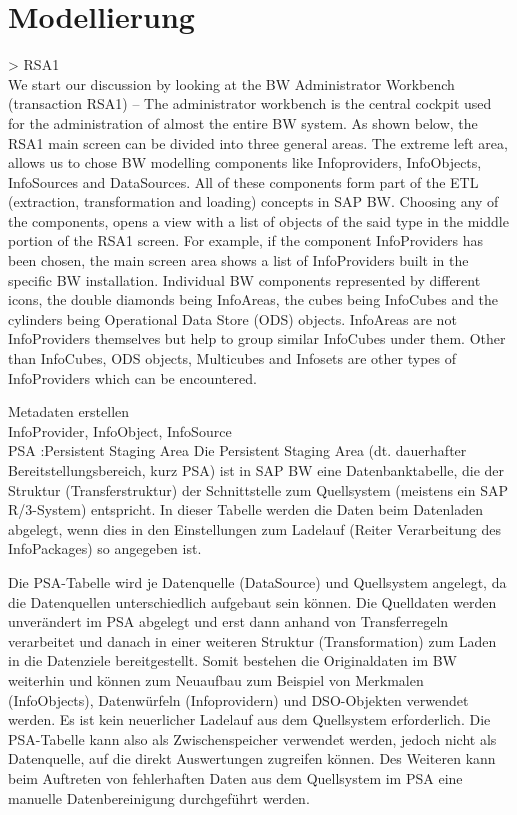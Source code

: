 \chapter{Modellierung}
> RSA1\\



We start our discussion by looking at the BW Administrator Workbench (transaction RSA1) – The administrator workbench is the central cockpit used for the administration of almost the entire BW system. As shown below, the RSA1 main screen can be divided into three general areas. The extreme left area, allows us to chose BW modelling components like Infoproviders, InfoObjects, InfoSources and DataSources. All of these components form part of the ETL (extraction, transformation and loading) concepts in SAP BW. Choosing any of the components, opens a view with a list of objects of the said type in the middle portion of the RSA1 screen. For example, if the component InfoProviders has been chosen, the main screen area shows a list of InfoProviders built in the specific BW installation. Individual BW components represented by different icons, the double diamonds being InfoAreas, the cubes being InfoCubes and the cylinders being Operational Data Store (ODS) objects. InfoAreas are not InfoProviders themselves but help to group similar InfoCubes under them. Other than InfoCubes, ODS objects, Multicubes and Infosets are other types of InfoProviders which can be encountered.



Metadaten erstellen\\
InfoProvider, InfoObject, InfoSource\\
PSA :Persistent Staging Area
Die Persistent Staging Area (dt. dauerhafter Bereitstellungsbereich, kurz PSA) ist in SAP BW eine Datenbanktabelle, die der Struktur (Transferstruktur) der Schnittstelle zum Quellsystem (meistens ein SAP R/3-System) entspricht. In dieser Tabelle werden die Daten beim Datenladen abgelegt, wenn dies in den Einstellungen zum Ladelauf (Reiter Verarbeitung des InfoPackages) so angegeben ist.

Die PSA-Tabelle wird je Datenquelle (DataSource) und Quellsystem angelegt, da die Datenquellen unterschiedlich aufgebaut sein können. Die Quelldaten werden unverändert im PSA abgelegt und erst dann anhand von Transferregeln verarbeitet und danach in einer weiteren Struktur (Transformation) zum Laden in die Datenziele bereitgestellt. Somit bestehen die Originaldaten im BW weiterhin und können zum Neuaufbau zum Beispiel von Merkmalen (InfoObjects), Datenwürfeln (Infoprovidern) und DSO-Objekten verwendet werden. Es ist kein neuerlicher Ladelauf aus dem Quellsystem erforderlich. Die PSA-Tabelle kann also als Zwischenspeicher verwendet werden, jedoch nicht als Datenquelle, auf die direkt Auswertungen zugreifen können. Des Weiteren kann beim Auftreten von fehlerhaften Daten aus dem Quellsystem im PSA eine manuelle Datenbereinigung durchgeführt werden.


